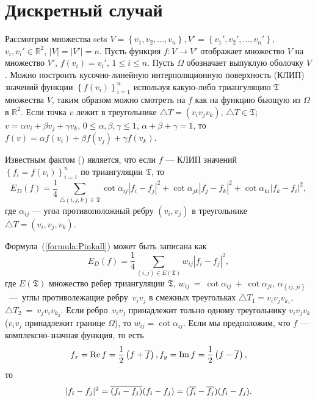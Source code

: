 \section{Дискретный случай}
\label{sec:discrete}

Рассмотрим множества sets $V = \left\{v_1, v_2, ... , v_n\right\}, 
V' = \left\{v_1', v_2', ... , v_n'\right\}$, $v_i, v_i' \in \mathbb{R}^2$, $|V| = |V'| = n$. 
Пусть функция $f: V \to V'$ отображает множество $V$ на множество $V'$, $f(v_i) = v_i'$, $1 \le i \le n$. 
Пусть $\Omega$ обозначает выпуклую оболочку $V$. 
Можно построить кусочно-линейную интерполяционную поверхность (КЛИП) значений функции 
$\left\{f(v_i)\right\}_{i=1}^n$ используя какую-либо триангуляцию $\mathfrak{T}$ множества $V$, 
таким образом можно смотреть на $f$ как на функцию бьющую из $\Omega$ в $\mathbb{R}^2$. 
Если точка $v$ лежит в треугольнике $\triangle T = (v_i v_j v_k)$, $\triangle T \in \mathfrak{T}$; $
v = \alpha v_i + \beta v_j + \gamma v_k$, $0 \le \alpha, \beta, \gamma \le 1$, $\alpha + \beta + \gamma = 1$, 
то $f(v) = \alpha f(v_i) + \beta f(v_j) + \gamma f(v_k)$.

Известным фактом (\cite{Pinkall93}) является, что если $f$ --- КЛИП значений 
$\left\{f_i = f(v_i)\right\}_{i=1}^n$ по триангуляции $\mathfrak{T}$, то
\begin{equation*}
  E_D(f) = \frac{1}{4} \sum_{\triangle (i, j, k) \in \mathfrak{T}} \cot{\alpha_{ij}}|f_i - f_j|^2 
  + \cot{\alpha_{jk}}|f_j - f_k|^2 + \cot{\alpha_{ki}}|f_k - f_i|^2,
\end{equation*}
где $\alpha_{ij}$ --- угол противоположный ребру $(v_i, v_j)$ в треугольнике $\triangle T = (v_i, v_j, v_k)$.   


Формула~(\ref{formula:Pinkall}) может быть записана как 
\begin{equation}
\label{formula:EDOverEdges}
  E_D(f) = \frac{1}{4} \sum_{\left( i, j \right) \in E\left(\mathfrak{T}\right)}{w_{ij} |f_i - f_j|^2}, 
\end{equation}
где $E(\mathfrak{T})$ множество ребер триангуляции $\mathfrak{T}$, 
$w_{ij}~=~\cot\alpha_{ij}~+~\cot\alpha_{ji}$, $\alpha_{\left\{{ij, ji}\right\}}$~---~углы 
противолежащие ребру~$v_i v_j$ в смежных треугольках $\triangle T_1=v_i v_j v_{k_1}$, 
$\triangle T_2~=~v_j v_i v_{k_2}$. Если ребро~$v_i v_j$ принадлежит тольно одному треугольнику 
$v_i v_j v_k$ ($v_i v_j$ принадлежит границе $\Omega$), то $w_{ij} = \cot \alpha_{ij}$.
Если мы предположим, что $f$ --- комплексно-значная функция, то есть  
$$f_x=\operatorname{Re}{f}=\frac{1}{2}\left(f + \overline{f}\right), f_y=\operatorname{Im}{f}=\frac{1}{2}\left(f - \overline{f}\right),$$ 
то $$|f_i - f_j|^2 = \overline{(f_i - f_j)}(f_i - f_j) = (\overline{f_i} - \overline{f_j})(f_i - f_j).$$ 

